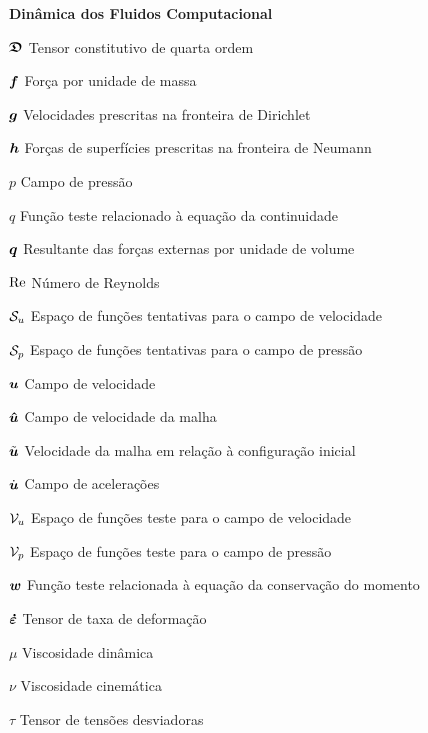 \begin{simbolos}
    \item[\textbf{Dinâmica dos Fluidos Computacional}]
    \item[$\boldsymbol{\mathfrak{D}}$] Tensor constitutivo de quarta ordem
    \item[$\boldsymbol{f}$] Força por unidade de massa
    \item[$\boldsymbol{g}$] Velocidades prescritas na fronteira de Dirichlet
    \item[$\boldsymbol{h}$] Forças de superfícies prescritas na fronteira de Neumann
    \item[$p$] Campo de pressão
    \item[$q$] Função teste relacionado à equação da continuidade
    \item[$\boldsymbol{q}$] Resultante das forças externas por unidade de volume
    \item[$\mathrm{Re}$] Número de Reynolds
    \item[$\mathcal{S}_u$] Espaço de funções tentativas para o campo de velocidade
    \item[$\mathcal{S}_p$] Espaço de funções tentativas para o campo de pressão
    \item[$\boldsymbol{u}$] Campo de velocidade
    \item[$\boldsymbol{\hat{u}}$] Campo de velocidade da malha
    \item[$\tilde{\boldsymbol{u}}$] Velocidade da malha em relação à configuração inicial
    \item[$\dot{\boldsymbol{u}}$] Campo de acelerações
    \item[$\mathcal{V}_u$] Espaço de funções teste para o campo de velocidade
    \item[$\mathcal{V}_p$] Espaço de funções teste para o campo de pressão
    \item[$\boldsymbol{w}$] Função teste relacionada à equação da conservação do momento
    \item[$\boldsymbol{\dot{\varepsilon}}$] Tensor de taxa de deformação
    \item[$\mu$] Viscosidade dinâmica
    \item[$\nu$] Viscosidade cinemática
    \item[$\tau$] Tensor de tensões desviadoras


\end{simbolos}
